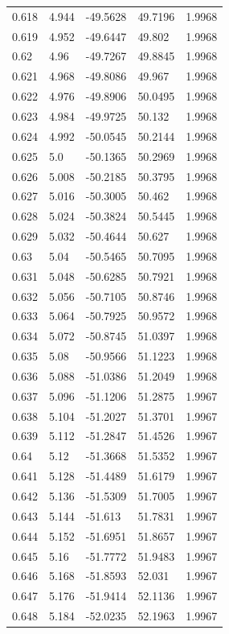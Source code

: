 \begin{tabular}{lllll}
0.618 & 4.944 & -49.5628 & 49.7196 & 1.9968 \\
0.619 & 4.952 & -49.6447 & 49.802 & 1.9968 \\
0.62 & 4.96 & -49.7267 & 49.8845 & 1.9968 \\
0.621 & 4.968 & -49.8086 & 49.967 & 1.9968 \\
0.622 & 4.976 & -49.8906 & 50.0495 & 1.9968 \\
0.623 & 4.984 & -49.9725 & 50.132 & 1.9968 \\
0.624 & 4.992 & -50.0545 & 50.2144 & 1.9968 \\
0.625 & 5.0 & -50.1365 & 50.2969 & 1.9968 \\
0.626 & 5.008 & -50.2185 & 50.3795 & 1.9968 \\
0.627 & 5.016 & -50.3005 & 50.462 & 1.9968 \\
0.628 & 5.024 & -50.3824 & 50.5445 & 1.9968 \\
0.629 & 5.032 & -50.4644 & 50.627 & 1.9968 \\
0.63 & 5.04 & -50.5465 & 50.7095 & 1.9968 \\
0.631 & 5.048 & -50.6285 & 50.7921 & 1.9968 \\
0.632 & 5.056 & -50.7105 & 50.8746 & 1.9968 \\
0.633 & 5.064 & -50.7925 & 50.9572 & 1.9968 \\
0.634 & 5.072 & -50.8745 & 51.0397 & 1.9968 \\
0.635 & 5.08 & -50.9566 & 51.1223 & 1.9968 \\
0.636 & 5.088 & -51.0386 & 51.2049 & 1.9968 \\
0.637 & 5.096 & -51.1206 & 51.2875 & 1.9967 \\
0.638 & 5.104 & -51.2027 & 51.3701 & 1.9967 \\
0.639 & 5.112 & -51.2847 & 51.4526 & 1.9967 \\
0.64 & 5.12 & -51.3668 & 51.5352 & 1.9967 \\
0.641 & 5.128 & -51.4489 & 51.6179 & 1.9967 \\
0.642 & 5.136 & -51.5309 & 51.7005 & 1.9967 \\
0.643 & 5.144 & -51.613 & 51.7831 & 1.9967 \\
0.644 & 5.152 & -51.6951 & 51.8657 & 1.9967 \\
0.645 & 5.16 & -51.7772 & 51.9483 & 1.9967 \\
0.646 & 5.168 & -51.8593 & 52.031 & 1.9967 \\
0.647 & 5.176 & -51.9414 & 52.1136 & 1.9967 \\
0.648 & 5.184 & -52.0235 & 52.1963 & 1.9967 \\

\end{tabular}

